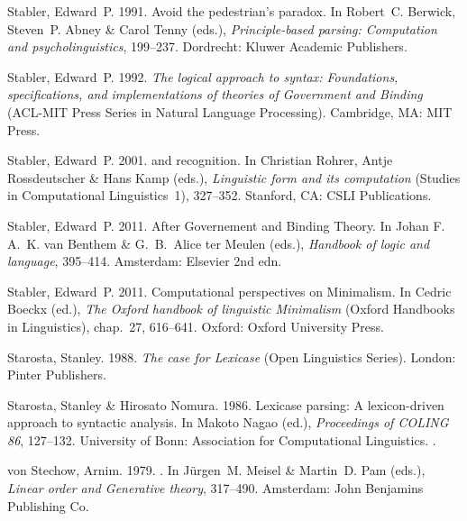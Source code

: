 \begin{thebibliography}{1420}
Stabler, Edward~P. 1991.
\newblock Avoid the pedestrian's paradox.
\newblock In Robert~C. Berwick, Steven~P. Abney \& Carol Tenny (eds.),
  \emph{Principle-based parsing: Computation and psycholinguistics}, 199--237.
  Dordrecht: Kluwer Academic Publishers.

Stabler, Edward~P. 1992.
\newblock \emph{The logical approach to syntax: {Foundations}, specifications,
  and implementations of theories of {Government and Binding}}  ({ACL-MIT}
  Press Series in Natural Language Processing).
\newblock Cambridge, MA: MIT Press.

Stabler, Edward~P. 2001.
 and recognition.
\newblock In Christian Rohrer, Antje Rossdeutscher \& Hans Kamp (eds.),
  \emph{Linguistic form and its computation} (Studies in Computational
  Linguistics~1), 327--352. Stanford, CA: CSLI Publications.

Stabler, Edward~P. 2011{}.
\newblock After {Governement and Binding Theory}.
\newblock In Johan F. A.~K. {van Benthem} \& G.~B.~Alice {ter Meulen} (eds.),
  \emph{Handbook of logic and language}, 395--414. Amsterdam: Elsevier 2nd edn.

Stabler, Edward~P. 2011{}.
\newblock Computational perspectives on {Minimalism}.
\newblock In Cedric Boeckx (ed.), \emph{The {Oxford} handbook of linguistic
  {Minimalism}}  (Oxford Handbooks in Linguistics), chap.~27, 616--641. Oxford:
  Oxford University Press.

Starosta, Stanley. 1988.
\newblock \emph{The case for {Lexicase}}  (Open Linguistics Series).
\newblock London: Pinter Publishers.

Starosta, Stanley \& Hirosato Nomura. 1986.
\newblock Lexicase parsing: {A} lexicon-driven approach to syntactic analysis.
\newblock In Makoto Nagao (ed.), \emph{Proceedings of {COLING} 86}, 127--132.
  University of Bonn: Association for Computational Linguistics.
\newblock {}.

von Stechow, Arnim. 1979.
.
\newblock In J{\"u}rgen~M. Meisel \& Martin~D. Pam (eds.), \emph{Linear order
  and {Generative} theory}, 317--490. Amsterdam: John Benjamins Publishing Co.


\end{thebibliography}
